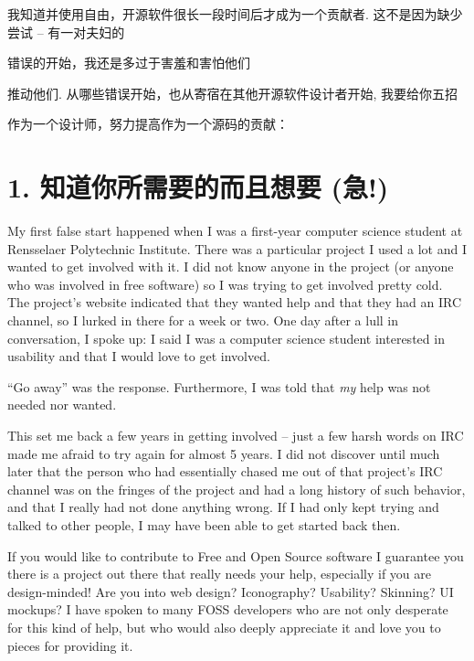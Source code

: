 ﻿


\noindent{}我知道并使用自由，开源软件很长一段时间后才成为一个贡献者. 这不是因为缺少尝试 -- 有一对夫妇的

错误的开始，我还是多过于害羞和害怕他们

推动他们. 从哪些错误开始，也从寄宿在其他开源软件设计者开始, 我要给你五招

作为一个设计师，努力提高作为一个源码的贡献：
\section*{1. 知道你所需要的而且想要 (急!)}

My first false start happened when I was a first-year computer science student
at Rensselaer Polytechnic Institute. There was a particular project I used a lot
and I wanted to get involved with it. I did not know anyone in the project (or
anyone who was involved in free software) so I was trying to get involved pretty
cold. The project's website indicated that they wanted help and that they had an
IRC channel, so I lurked in there for a week or two. One day after a lull in
conversation, I spoke up: I said I was a computer science student interested in
usability and that I would love to get involved.

``Go away'' was the response. Furthermore, I was told that \emph{my} help was not
needed nor wanted. 

This set me back a few years in getting involved -- just a few harsh words on IRC
made me afraid to try again for almost 5 years.  I did not discover until much
later that the person who had essentially chased me out of that project's IRC
channel was on the fringes of the project and had a long history of such
behavior, and that I really had not done anything wrong. If I had only kept
trying and talked to other people, I may have been able to get started back
then.

If you would like to contribute to Free and Open Source software I guarantee you
there is a project out there that really needs your help, especially if you are
design-minded! Are you into web design? Iconography? Usability? Skinning? UI
mockups? I have spoken to many FOSS developers who are not only desperate for
this kind of help, but who would also deeply appreciate it and love you to
pieces for providing it.

